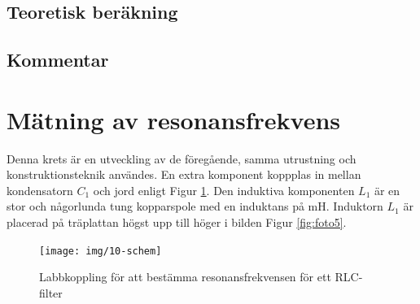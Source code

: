 \documentclass[11pt,a4paper]{article}
\begin{document}
\subsection{Teoretisk beräkning}\label{}

\subsection{Kommentar}\label{}


\section{Mätning av resonansfrekvens}\label{}
Denna krets är en utveckling av de föregående, samma utrustning och 
konstruktionsteknik användes. En extra komponent koppplas in mellan kondensatorn
$C_{1}$ och jord enligt Figur \ref{fig:10-schem}. Den induktiva komponenten
$L_{1}$ är en stor och någorlunda tung kopparspole med en induktans på 
\unit[1]{\si{\milli\henry}}. Induktorn $L_{1}$ är placerad på träplattan högst
upp till höger i bilden Figur \ref{fig:foto5}.

\begin{figure}
    \centering
    \texttt{[image: img/10-schem]}
    \caption[Mätning av resonansfrekvens]
    {Labbkoppling för att bestämma resonansfrekvensen för ett RLC-filter}
    \label{fig:10-schem}
\end{figure}
\end{document}
